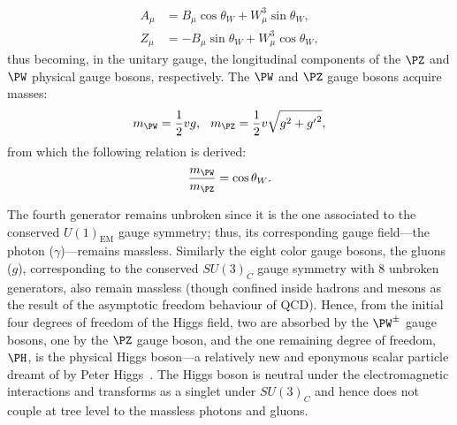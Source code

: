 \begin{align*}
    A_\mu &= B_\mu \cos{\theta_W}  + W^3_\mu \sin{\theta_W},
    \\
    Z_\mu &= -B_\mu \sin{\theta_W}  + W^3_\mu \cos{\theta_W},
\end{align*}
thus becoming, in the unitary gauge, the longitudinal components of the $\PZ$ and $\PW$ physical gauge bosons, respectively. %
The $\PW$ and $\PZ$ gauge bosons acquire masses:
\begin{equation*}
    m_{\PW} = \frac{1}{2}vg, \hspace{7pt} m_{\PZ} = \frac{1}{2} v \sqrt{g^2+{g^\prime}^2},
\end{equation*}
from which the following relation is derived:
\begin{equation*}
    \frac{m_{\PW}}{m_{\PZ}} = \cos{\theta_W}.
\end{equation*}

The fourth generator remains unbroken since it is the one associated to the conserved $U(1)_\text{EM}$ gauge symmetry; thus, its corresponding gauge field---the photon ($\gamma$)---remains massless.
Similarly the eight color gauge bosons, the gluons ($g$), corresponding to the conserved $SU(3)_C$ gauge symmetry with 8 unbroken generators, also remain massless (though confined inside hadrons and mesons as the result of the asymptotic freedom behaviour of QCD).
Hence, from the initial four degrees of freedom of the Higgs field, two are absorbed by the $\PW^\pm$ gauge bosons, one by the $\PZ$ gauge boson, and the one remaining degree of freedom, $\PH$, is the physical Higgs boson---a relatively new and eponymous scalar particle dreamt of by Peter Higgs~\cite{PhysRevLett.13.321,PhysRev.145.1156}.
The Higgs boson is neutral under the electromagnetic interactions and transforms as a singlet under $SU(3)_C$ and hence does not couple at tree level to the massless photons and gluons.

